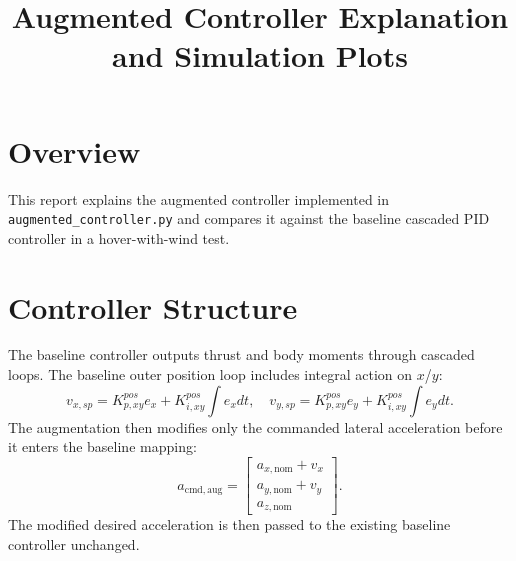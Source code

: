 \documentclass[11pt]{article}
\title{Augmented Controller Explanation and Simulation Plots}
\date{}
\begin{document}
\maketitle

\section{Overview}
This report explains the augmented controller implemented in \texttt{augmented\_controller.py} and compares it against the baseline cascaded PID controller in a hover-with-wind test.

\section{Controller Structure}
The baseline controller outputs thrust and body moments through cascaded loops. The baseline outer position loop includes integral action on $x$/$y$:
\begin{equation}
v_{x,sp}=K_{p,xy}^{pos}e_x + K_{i,xy}^{pos}\int e_x dt,\quad
v_{y,sp}=K_{p,xy}^{pos}e_y + K_{i,xy}^{pos}\int e_y dt.
\end{equation}
The augmentation then modifies only the commanded lateral acceleration before it enters the baseline mapping:
\begin{equation}
a_{\mathrm{cmd,aug}} =
\begin{bmatrix}
a_{x,\mathrm{nom}} + v_x\\
a_{y,\mathrm{nom}} + v_y\\
a_{z,\mathrm{nom}}
\end{bmatrix}.
\end{equation}
The modified desired acceleration is then passed to the existing baseline controller unchanged.
\end{document}
